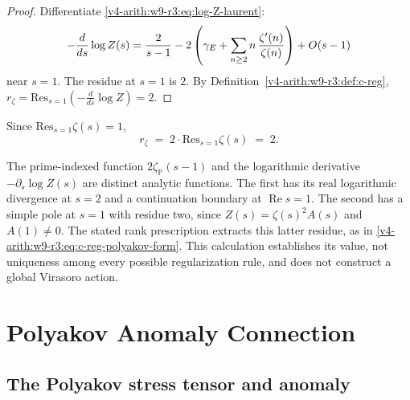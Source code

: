 \begin{proof}
Differentiate \eqref{v4-arith:w9-r3:eq:log-Z-laurent}:
\[
-\frac{d}{ds}\log Z(s)=\frac{2}{s-1}
-2\left(\gamma_{E}+\sum_{n\geq2}n\,{\zeta'(n)\over\zeta(n)}\right)
+O(s-1)
\]
near \(s=1\). The residue at \(s=1\) is \(2\).
By Definition~\ref{v4-arith:w9-r3:def:c-reg},
\(r_{\zeta}=\mathrm{Res}_{s=1}(-\frac{d}{ds}\log Z)=2\).
\end{proof}

\begin{corollary}[\(r_{\zeta}=2\cdot\mathrm{Res}_{s=1}\zeta(s)\)]
\label{v4-arith:w9-r3:cor:c-reg-as-residue}
Since \(\mathrm{Res}_{s=1}\zeta(s)=1\),
\begin{equation}
\label{v4-arith:w9-r3:eq:c-reg-polyakov-form}
r_{\zeta}\;=\;2\cdot\mathrm{Res}_{s=1}\zeta(s)\;=\;2.
\end{equation}
\end{corollary}

\begin{remark}
\label{v4-arith:w9-r3:rem:dirichlet-form}
The prime-indexed function \(2\zeta_{\mathbb P}(s-1)\) and the
logarithmic derivative \(-\partial_s\log Z(s)\) are distinct
analytic functions. The first has its real logarithmic divergence
at \(s=2\) and a continuation boundary at \(\operatorname{Re}s=1\).
The second has a simple pole at \(s=1\) with residue two, since
\(Z(s)=\zeta(s)^2A(s)\) and \(A(1)\ne0\).
The stated rank prescription extracts this latter residue, as in
\eqref{v4-arith:w9-r3:eq:c-reg-polyakov-form}. This calculation
establishes its value, not uniqueness among every possible
regularization rule, and does not construct a global Virasoro action.
\end{remark}

\section{Polyakov Anomaly Connection}
\label{v4-arith:w9-r3:polyakov-connection}

\subsection{The Polyakov stress tensor and anomaly}
\label{v4-arith:w9-r3:polyakov-stress}

